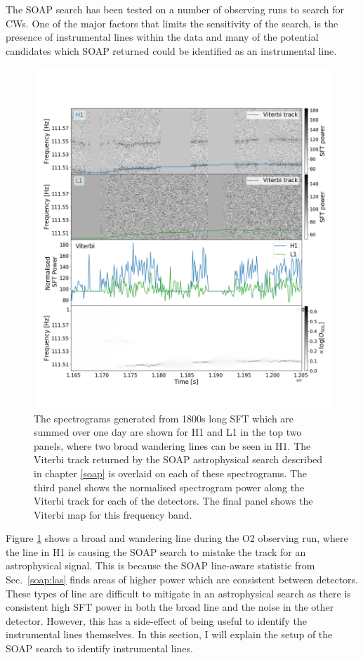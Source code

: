 % 
The SOAP search has been tested on a number of observing runs
to search for \glspl{CW}.  One of the major factors that
limits the sensitivity
of the search, is the presence of instrumental lines within the
data and many of
the potential candidates which SOAP returned could be identified as an
instrumental line.
%
\begin{figure}[hp]
	\includegraphics[width=\textwidth]{C6_detchar/plot_F111_5_wandering_line.png}
        \caption[Broad wandering line example.]{ The spectrograms generated from 1800s long \gls{SFT} which are summed over one day are shown for H1 and L1 in the top two panels, where two broad wandering lines can be seen in H1.
        The Viterbi track returned by the SOAP astrophysical search described in chapter \ref{soap} is overlaid on each of these spectrograms.
        The third panel shows the normalised spectrogram power along the Viterbi track for each of the detectors. The final
        panel shows the Viterbi map for this frequency band.
			}
\label{detchar:soap:astrowander}

\end{figure}
%
Figure \ref{detchar:soap:astrowander} shows a broad and wandering line during the O2 observing run, where the line in H1 is causing the SOAP search to mistake the track for an astrophysical signal.
This is because the SOAP line-aware statistic from Sec.~\ref{soap:las} finds
areas of higher power which are consistent between detectors. These types of line are difficult to mitigate in an astrophysical
search as there is consistent high \gls{SFT} power in both the broad line and the noise in the other detector.
However, this has a side-effect of being useful to identify the
instrumental lines themselves.
In this section, I will explain the setup of the SOAP search to identify
instrumental lines.


